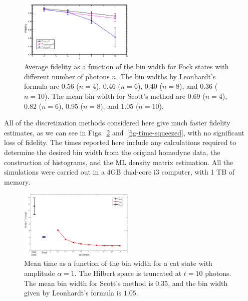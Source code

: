 \documentclass[
reprint,
superscriptaddress,
showpacs,
amsmath,
amssymb,
aps,
pra,
longbibliography
]{revtex4-1}
\begin{document}
\begin{figure}
  \includegraphics[width=0.49\textwidth]{fock.eps}
  \caption{Average fidelity as a function of the bin width for Fock states 
with different number of photons $n$. The bin widths by Leonhardt's formula are
0.56 ($n=4$), 0.46 ($n=6$), 0.40 ($n=8$), and 0.36 ($n=10$). The mean bin width 
for Scott's method are 0.69 ($n=4$), 0.82 ($n=6$), 0.95 ($n=8$), and 1.05 ($n=10$).}
  \label{fig-fock}
\end{figure}

All of the discretization methods considered here
give much faster fidelity estimates, as we can see in 
Figs.~\ref{fig-time-catstate} and~\ref{fig-time-squeezed}, with no 
significant loss of fidelity. The times reported here include
  any calculations required to determine the desired bin width from
  the original homodyne data, the construction of histograms, and the
  ML density matrix estimation. All the simulations were carried out in
  a 4GB dual-core i3 computer, with 1 TB of memory.

\begin{figure}
  \includegraphics[width=0.49\textwidth]{time-estadogato_alpha_1.eps}
  \caption{Mean time as a function of the bin width for a cat state
    with amplitude $\alpha = 1$. The Hilbert space is truncated at $t=10$
    photons. The mean bin width for Scott's method is $0.35$, and the
    bin width given by Leonhardt's formula is $1.05$.}
  \label{fig-time-catstate}
\end{figure}
\end{document}
